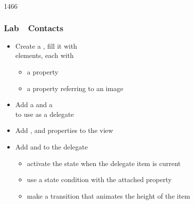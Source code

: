 \begin{slide}{1466}\frametitle{Lab~\textendash~Contacts}


\begin{itemize}
\item Create a , fill it with\\
       elements, each with
  \begin{itemize}
  \item a  property
  \item a  property referring to an image
  \end{itemize}
\item Add a  and a \\
      to use as a delegate
\item Add ,  and 
      properties to the view
\item Add  and  to the delegate
  \begin{itemize}
  \item activate the state when the delegate item is current
  \item use a state condition with the 
        attached property
  \item make a transition that animates the height of the item
  \end{itemize}
\end{itemize}

\end{slide}

